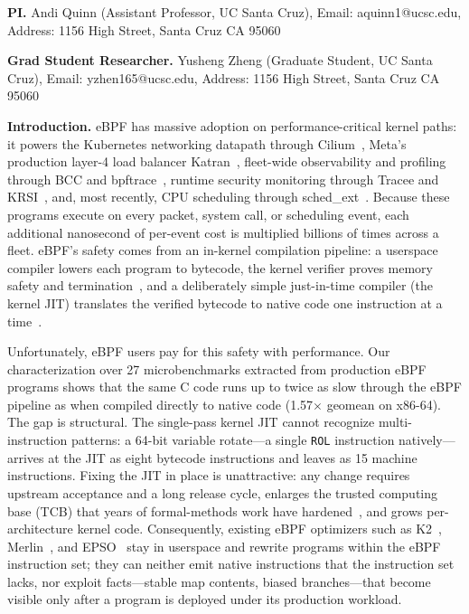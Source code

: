 \noindent \textbf{PI.} Andi Quinn (Assistant Professor, UC Santa Cruz), Email: aquinn1@ucsc.edu, Address: 1156 High Street, Santa Cruz CA 95060

\noindent \textbf{Grad Student Researcher.} Yusheng Zheng (Graduate Student, UC Santa Cruz), Email: yzhen165@ucsc.edu, Address: 1156 High Street, Santa Cruz CA 95060


\noindent \textbf{Introduction.}
eBPF has massive adoption on performance-critical kernel paths: it powers the Kubernetes networking datapath through Cilium~\cite{cilium}, Meta's production layer-4 load balancer Katran~\cite{katran}, fleet-wide observability and profiling through BCC and bpftrace~\cite{bcc,bpftrace}, runtime security monitoring through Tracee and KRSI~\cite{tracee,krsi_lwn}, and, most recently, CPU scheduling through sched\_ext~\cite{sched_ext_lwn}.  Because these programs execute on every packet, system call, or scheduling event, each additional nanosecond of per-event cost is multiplied billions of times across a fleet.  eBPF's safety comes from an in-kernel compilation pipeline: a userspace compiler lowers each program to bytecode, the kernel verifier proves memory safety and termination~\cite{verifier,gershuni2019simple}, and a deliberately simple just-in-time compiler (the kernel JIT) translates the verified bytecode to native code one instruction at a time~\cite{linux_bpf_jit}.

Unfortunately, eBPF users pay for this safety with performance.  Our characterization over 27 microbenchmarks extracted from production eBPF programs shows that the same C code runs up to twice as slow through the eBPF pipeline as when compiled directly to native code (1.57$\times$ geomean on x86-64).  The gap is structural.  The single-pass kernel JIT cannot recognize multi-instruction patterns: a 64-bit variable rotate---a single \texttt{ROL} instruction natively---arrives at the JIT as eight bytecode instructions and leaves as 15 machine instructions.  Fixing the JIT in place is unattractive: any change requires upstream acceptance and a long release cycle, enlarges the trusted computing base (TCB) that years of formal-methods work have hardened~\cite{nelson2020specification,vishwanathan2023verifying}, and grows per-architecture kernel code.  Consequently, existing eBPF optimizers such as K2~\cite{xu2021synthesizing}, Merlin~\cite{mao2024merlin}, and EPSO~\cite{zhu2025epso} stay in userspace and rewrite programs within the eBPF instruction set; they can neither emit native instructions that the instruction set lacks, nor exploit facts---stable map contents, biased branches---that become visible only after a program is deployed under its production workload.

